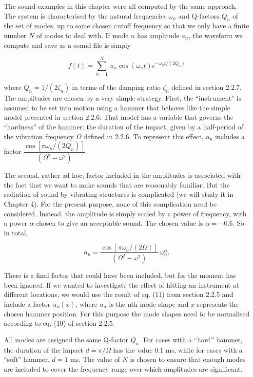   The sound examples in this chapter were all computed by the same approach. 
  The system is characterised by the natural frequencies $\omega_n$ and 
  Q-factors $Q_n$ of the set of modes, up to some chosen cutoff frequency so 
  that we only have a finite number $N$ of modes to deal with. If mode $n$ has 
  amplitude $a_n$, the waveform we compute and save as a sound file is simply 

  $$f(t)=\sum_{n=1}^N~a_n \cos(\omega_n t) e^{-\omega_n t /(2 Q_n)} \tag{1}$$ 

  where $Q_n = 1/(2\zeta_n)$ in terms of the damping ratio $\zeta_n$ defined in 
  section 2.2.7. The amplitudes are chosen by a very simple strategy. First, 
  the ``instrument'' is assumed to be set into motion using a hammer that 
  behaves like the simple model presented in section 2.2.6. That model has a 
  variable that governs the ``hardness'' of the hammer: the duration of the 
  impact, given by a half-period of the vibration frequency $\Omega$ defined in 
  2.2.6. To represent this effect, $a_n$ includes a factor $\dfrac{\cos[\pi 
  \omega_n/(2 Q_n)]}{(\Omega^2-\omega^2)}$. 

  The second, rather ad hoc, factor included in the amplitudes is associated 
  with the fact that we want to make sounds that are reasonably familiar. But 
  the radiation of sound by vibrating structures is complicated (we will study 
  it in Chapter 4). For the present purpose, none of this complication need be 
  considered. Instead, the amplitude is simply scaled by a power of frequency, 
  with a power $\alpha$ chosen to give an acceptable sound. The chosen value is 
  $\alpha = -0.6$. So in total, 

  $$a_n=\dfrac{\cos[\pi \omega_n/(2 
  \Omega)]}{(\Omega^2-\omega^2)}~\omega_n^\alpha.\tag{2}$$ 

  There is a final factor that could have been included, but for the moment has 
  been ignored. If we wanted to investigate the effect of hitting an instrument 
  at different locations, we would use the result of eq. (11) from section 
  2.2.5 and include a factor $u_n(x)$, where $u_n$ is the nth mode shape and 
  $x$ represents the chosen hammer position. For this purpose the mode shapes 
  need to be normalised according to eq. (10) of section 2.2.5. 

  All modes are assigned the same Q-factor $Q_n$. For cases with a ``hard'' 
  hammer, the duration of the impact $d=\pi / \Omega$ has the value 0.1 ms, 
  while for cases with a ``soft'' hammer, $d=1$ ms. The value of $N$ is chosen 
  to ensure that enough modes are included to cover the frequency range over 
  which amplitudes are significant. 